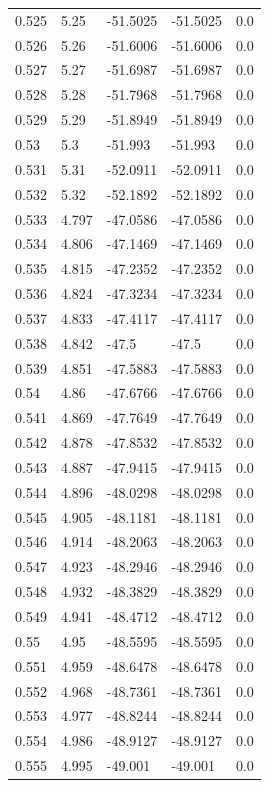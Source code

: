 \begin{table}[H]
\begin{tabular}{lllll}
0.525 & 5.25 & -51.5025 & -51.5025 & 0.0 \\
0.526 & 5.26 & -51.6006 & -51.6006 & 0.0 \\
0.527 & 5.27 & -51.6987 & -51.6987 & 0.0 \\
0.528 & 5.28 & -51.7968 & -51.7968 & 0.0 \\
0.529 & 5.29 & -51.8949 & -51.8949 & 0.0 \\
0.53 & 5.3 & -51.993 & -51.993 & 0.0 \\
0.531 & 5.31 & -52.0911 & -52.0911 & 0.0 \\
0.532 & 5.32 & -52.1892 & -52.1892 & 0.0 \\
0.533 & 4.797 & -47.0586 & -47.0586 & 0.0 \\
0.534 & 4.806 & -47.1469 & -47.1469 & 0.0 \\
0.535 & 4.815 & -47.2352 & -47.2352 & 0.0 \\
0.536 & 4.824 & -47.3234 & -47.3234 & 0.0 \\
0.537 & 4.833 & -47.4117 & -47.4117 & 0.0 \\
0.538 & 4.842 & -47.5 & -47.5 & 0.0 \\
0.539 & 4.851 & -47.5883 & -47.5883 & 0.0 \\
0.54 & 4.86 & -47.6766 & -47.6766 & 0.0 \\
0.541 & 4.869 & -47.7649 & -47.7649 & 0.0 \\
0.542 & 4.878 & -47.8532 & -47.8532 & 0.0 \\
0.543 & 4.887 & -47.9415 & -47.9415 & 0.0 \\
0.544 & 4.896 & -48.0298 & -48.0298 & 0.0 \\
0.545 & 4.905 & -48.1181 & -48.1181 & 0.0 \\
0.546 & 4.914 & -48.2063 & -48.2063 & 0.0 \\
0.547 & 4.923 & -48.2946 & -48.2946 & 0.0 \\
0.548 & 4.932 & -48.3829 & -48.3829 & 0.0 \\
0.549 & 4.941 & -48.4712 & -48.4712 & 0.0 \\
0.55 & 4.95 & -48.5595 & -48.5595 & 0.0 \\
0.551 & 4.959 & -48.6478 & -48.6478 & 0.0 \\
0.552 & 4.968 & -48.7361 & -48.7361 & 0.0 \\
0.553 & 4.977 & -48.8244 & -48.8244 & 0.0 \\
0.554 & 4.986 & -48.9127 & -48.9127 & 0.0 \\
0.555 & 4.995 & -49.001 & -49.001 & 0.0 \\

\end{tabular}
\end{table}
